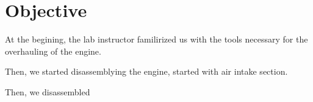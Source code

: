 \documentclass[12pt]{article}
\begin{document}
\section{Objective}

\begin{itemize*}
    \item At the begining, the lab instructor familirized us with the tools necessary for the overhauling of the engine.
    \item Then, we started disassemblying the engine, started with air intake section.
    \item Then, we disassembled 
\end{itemize*}
\end{document}
